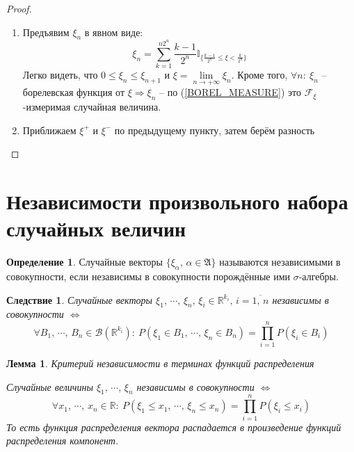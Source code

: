 \documentclass[a4paper,12pt]{article}
\renewcommand{\leq}{\ensuremath{\leqslant}}
\theoremstyle{plain}
\newtheorem{lemma}{Лемма}[section]
\newtheorem*{corollary}{Следствие}
\theoremstyle{definition}
\newtheorem{definition}{Определение}[section]
\theoremstyle{remark}
\begin{document}
\begin{proof}
  \begin{enumerate}
    \item Предъявим $\xi_n$ в явном виде:
    \[\xi_n = \sum_{k = 1}^{n2^n}\frac{k - 1}{2^n}\mathbb{I}_{\{\frac{k - 1}{2^n} \leq \xi < \frac{k}{2^n}\}}\]
    Легко видеть, что $0 \leq \xi_n \leq \xi_{n + 1}$ и $\xi = \lim\limits_{n \to +\infty} \xi_n$. Кроме того, $\forall n:\: \xi_n$ -- борелевская функция от $\xi \Rightarrow \xi_n$ -- по (\ref{BOREL_MEASURE}) это $\mathcal{F}_\xi$-измеримая случайная величина.
    \item Приближаем $\xi^+$ и $\xi^-$ по предыдущему пункту, затем берём разность
  \end{enumerate}
\end{proof}

\section{Независимости произвольного набора случайных величин}
\begin{definition}
  Случайные векторы $\{\xi_\alpha,\, \alpha \in \mathfrak{A}\}$ называются независимыми в совокупности, если независимы в совокупности порождённые ими $\sigma$-алгебры.
\end{definition}

\begin{corollary}
  Случайные векторы $\xi_1,\,\cdots,\,\xi_n,\, \xi_i \in \mathbb{R}^{k_i},\, i = \overline{1,\,n}$ независимы в совокупности $\Leftrightarrow$
  \[\forall B_1,\,\cdots,\,B_n \in \mathcal{B}(\mathbb{R}^{k_i}) :\: P(\xi_1 \in B_1,\,\cdots,\,\xi_n \in B_n) = \prod_{i = 1}^n P(\xi_i \in B_i)\]
\end{corollary}

\begin{lemma}
  Критерий независимости в терминах функций распределения

  Случайные величины $\xi_1,\,\cdots,\,\xi_n$ независимы в совокупности $\Leftrightarrow$
  \[\forall x_1,\,\cdots,\,x_n \in \mathbb{R} :\: P(\xi_1 \leq x_1,\,\cdots,\,\xi_n \leq x_n) = \prod_{i = 1}^n P(\xi_i \leq x_i)\]
  То есть функция распределения вектора распадается в произведение функций распределения компонент.
\end{lemma}
\end{document}

